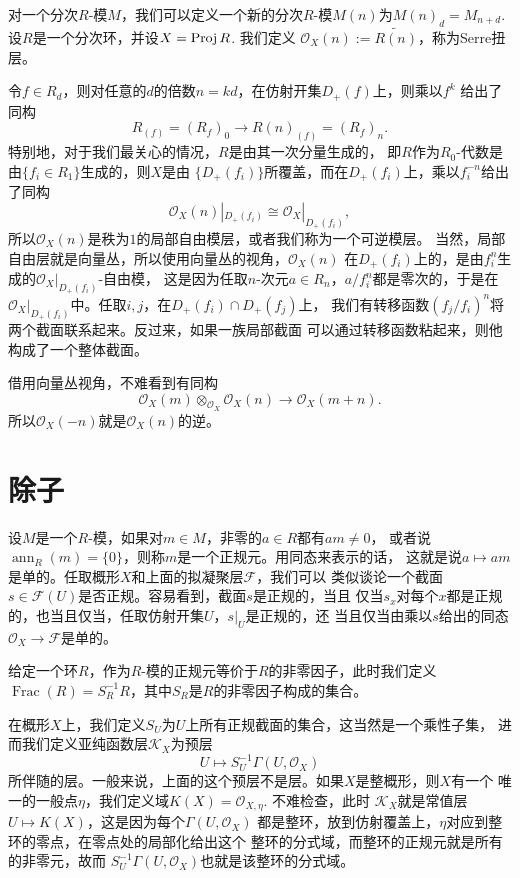 \begin{para}[Serre扭层]
    对一个分次$R$-模$M$，我们可以定义一个新的分次$R$-模$M(n)$为$M(n)_d=M_{n+d}$.
    设$R$是一个分次环，并设$X=\operatorname{Proj} R$. 我们定义
    $\mathcal O_X(n):=\widetilde{R(n)}$，称为Serre扭层。

    令$f\in R_d$，则对任意的$d$的倍数$n=kd$，在仿射开集$D_+(f)$上，则乘以$f^k$
    给出了同构
    \[
        R_{(f)}=(R_f)_0\to R(n)_{(f)}=(R_f)_n.
    \] 
    特别地，对于我们最关心的情况，$R$是由其一次分量生成的，
    即$R$作为$R_0$-代数是由$\{f_i\in R_1\}$生成的，则$X$是由
    $\{D_+(f_i)\}$所覆盖，而在$D_+(f_i)$上，乘以$f_i^{-n}$给出了同构
    \[
        \mathcal O_X(n)|_{D_+(f_i)}\cong \mathcal O_X|_{D_+(f_i)},
    \]
    所以$\mathcal O_X(n)$是秩为$1$的局部自由模层，或者我们称为一个可逆模层。
    当然，局部自由层就是向量丛，所以使用向量丛的视角，$\mathcal O_X(n)$
    在$D_+(f_i)$上的，是由$f_i^n$生成的$\mathcal O_X|_{D_+(f_i)}$-自由模，
    这是因为任取$n$-次元$a\in R_n$，$a/f_i^n$都是零次的，于是在
    $\mathcal O_X|_{D_+(f_i)}$中。任取$i,j$，在$D_+(f_i)\cap D_+(f_j)$上，
    我们有转移函数$(f_j/f_i)^n$将两个截面联系起来。反过来，如果一族局部截面
    可以通过转移函数粘起来，则他构成了一个整体截面。

    借用向量丛视角，不难看到有同构
    \[
        \mathcal O_X(m)\otimes_{\mathcal O_X}\mathcal O_X(n)
        \to \mathcal O_X(m+n).
    \]
    所以$\mathcal O_X(-n)$就是$\mathcal O_X(n)$的逆。
\end{para}

\section{除子}

\para[正规截面] 设$M$是一个$R$-模，如果对$m\in M$，非零的$a\in R$都有$am\neq 0$，
或者说$\operatorname{ann}_R(m)=\{0\}$，则称$m$是一个正规元。用同态来表示的话，
这就是说$a\mapsto am$是单的。任取概形$X$和上面的拟凝聚层$\mathcal F$，我们可以
类似谈论一个截面$s\in \mathcal F(U)$是否正规。容易看到，截面$s$是正规的，当且
仅当$s_x$对每个$x$都是正规的，也当且仅当，任取仿射开集$U$，$s|_U$是正规的，还
当且仅当由乘以$s$给出的同态$\mathcal O_X\to \mathcal F$是单的。
\endpara

给定一个环$R$，作为$R$-模的正规元等价于$R$的非零因子，此时我们定义
$\operatorname{Frac}(R)=S_R^{-1}R$，其中$S_R$是$R$的非零因子构成的集合。

\para[亚纯函数层]
在概形$X$上，我们定义$S_U$为$U$上所有正规截面的集合，这当然是一个乘性子集，
进而我们定义亚纯函数层$\mathcal K_X$为预层
\[
    U\mapsto S_U^{-1}\Gamma(U,\mathcal O_X)
\]
所伴随的层。一般来说，上面的这个预层不是层。如果$X$是整概形，则$X$有一个
唯一的一般点$\eta$，我们定义域$K(X)=\mathcal O_{X,\eta}$. 不难检查，此时
$\mathcal K_X$就是常值层$U\mapsto K(X)$，这是因为每个$\Gamma(U,\mathcal O_X)$
都是整环，放到仿射覆盖上，$\eta$对应到整环的零点，在零点处的局部化给出这个
整环的分式域，而整环的正规元就是所有的非零元，故而
$S_U^{-1}\Gamma(U,\mathcal O_X)$也就是该整环的分式域。
\endpara

